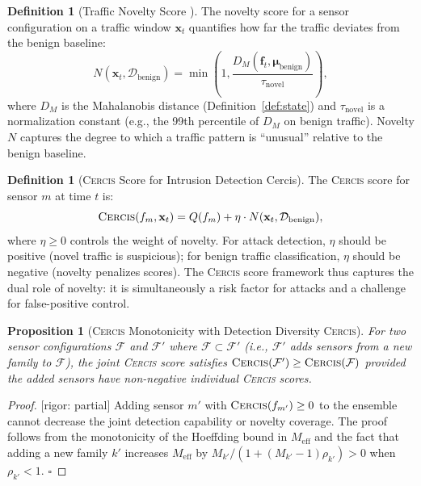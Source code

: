 \documentclass[11pt,a4paper]{article}
\newtheorem{proposition}[theorem]{Proposition}
\theoremstyle{definition}
\newtheorem{definition}[theorem]{Definition}
\theoremstyle{remark}
\newcommand{\rigorPartial}{\textcolor{orange!80!black}{[rigor: partial]}}
\newcommand{\Cercis}{\textsc{Cercis}}
\newcommand{\cD}{\mathcal{D}}
\newcommand{\cF}{\mathcal{F}}
\newcommand{\sensorstate}{\mathbf{x}}
\newcommand{\flowvec}{\mathbf{f}}
\begin{document}
\begin{definition}[Traffic Novelty Score ]
\label{def:N_cyber}
The novelty score for a sensor configuration on a traffic window $\sensorstate_t$ quantifies how far the traffic deviates from the benign baseline:
\begin{equation}
N(\sensorstate_t, \cD_{\mathrm{benign}}) = \min\!\left(1, \frac{D_M(\flowvec_t, \boldsymbol{\mu}_{\mathrm{benign}})}{\tau_{\mathrm{novel}}}\right),
\label{eq:N_cyber}
\end{equation}
where $D_M$ is the Mahalanobis distance (Definition~\ref{def:state}) and $\tau_{\mathrm{novel}}$ is a normalization constant (e.g., the 99th percentile of $D_M$ on benign traffic). Novelty $N$ captures the degree to which a traffic pattern is ``unusual'' relative to the benign baseline.
\end{definition}

\begin{definition}[\Cercis{} Score for Intrusion Detection Cercis]
\label{def:cercis_cyber}
The \Cercis{} score for sensor $m$ at time $t$ is:
\begin{equation}
\Cercis(f_m, \sensorstate_t) = Q(f_m) + \eta \cdot N(\sensorstate_t, \cD_{\mathrm{benign}}),
\label{eq:cercis_cyber}
\end{equation}
where $\eta \geq 0$ controls the weight of novelty. For attack detection, $\eta$ should be positive (novel traffic is suspicious); for benign traffic classification, $\eta$ should be negative (novelty penalizes scores). The \Cercis{} score framework thus captures the dual role of novelty: it is simultaneously a risk factor for attacks and a challenge for false-positive control.
\end{definition}

\begin{proposition}[\Cercis{} Monotonicity with Detection Diversity \Cercis]
\label{prop:cercis_monotone}
For two sensor configurations $\cF$ and $\cF'$ where $\cF \subset \cF'$ (i.e., $\cF'$ adds sensors from a new family to $\cF$), the joint \Cercis{} score satisfies $\Cercis(\cF') \geq \Cercis(\cF)$ provided the added sensors have non-negative individual \Cercis{} scores.
\end{proposition}

\begin{proof}\rigorPartial
Adding sensor $m'$ with $\Cercis(f_{m'}) \geq 0$ to the ensemble cannot decrease the joint detection capability or novelty coverage. The proof follows from the monotonicity of the Hoeffding bound in $M_{\mathrm{eff}}$ and the fact that adding a new family $k'$ increases $M_{\mathrm{eff}}$ by $M_{k'} / (1 + (M_{k'} - 1) \rho_{k'}) > 0$ when $\rho_{k'} < 1$. $\square$
\end{proof}
\end{document}
